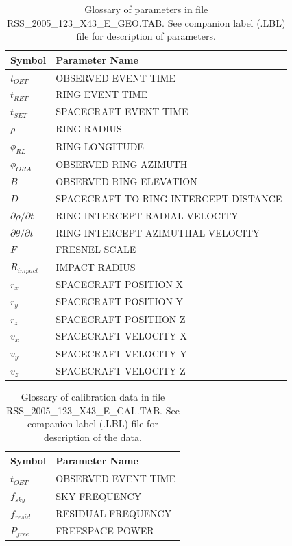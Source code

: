 \documentclass[crop=false,class=book]{standalone}
\begin{document}
\begin{table}[H]
    \centering
    \begin{tabular}{l l} 
        \hline
        Symbol 			& Parameter Name \\ %
        \hline
        $t_{OET}$		& OBSERVED EVENT TIME \\ 
        $t_{RET}$ 		& RING EVENT TIME \\
        $t_{SET}$ 		& SPACECRAFT EVENT TIME \\
        $\rho$	 		& RING RADIUS \\
        $\phi_{RL}$		& RING LONGITUDE \\
        $\phi_{ORA}$		& OBSERVED RING AZIMUTH \\
        $B$				& OBSERVED RING ELEVATION \\
        $D$				& SPACECRAFT TO RING INTERCEPT DISTANCE \\
        $\partial\rho/\partial t$	& RING INTERCEPT RADIAL VELOCITY \\
        $\partial\theta/\partial t$	& RING INTERCEPT AZIMUTHAL VELOCITY \\
        $F$				& FRESNEL SCALE \\
        $R_{impact}$		& IMPACT RADIUS \\
        $r_x$			& SPACECRAFT POSITION X \\
        $r_y$			& SPACECRAFT POSITION Y \\
        $r_z$			& SPACECRAFT POSITIION Z \\
        $v_x$			& SPACECRAFT VELOCITY X \\
        $v_y$			& SPACECRAFT VELOCITY Y \\
        $v_z$			& SPACECRAFT VELOCITY Z \\
        \hline
    \end{tabular}
    \caption[Glossary of Parameters from the Geo File]{Glossary of parameters in file RSS\_2005\_123\_X43\_E\_GEO.TAB. See companion label (.LBL) file for description of parameters.}
    \label{tab:easydata_glossary_of_geo_file}
\end{table}
\begin{table}[H]
    \centering
    \begin{tabular}{l l}
        \hline
        Symbol			& Parameter Name \\
        \hline
        $t_{OET}$			& OBSERVED EVENT TIME \\
        $f_{sky}$			& SKY FREQUENCY \\
        $f_{resid}$		& RESIDUAL FREQUENCY \\
        $P_{free}$		& FREESPACE POWER \\
        \hline
    \end{tabular}
    \caption[Glossary of Data from the Cal File]{Glossary of calibration data in file RSS\_2005\_123\_X43\_E\_CAL.TAB. See companion label (.LBL) file for description of the data.}
    \label{tab:easydata_glossary_from_cal_file}
\end{table}
\end{document}
